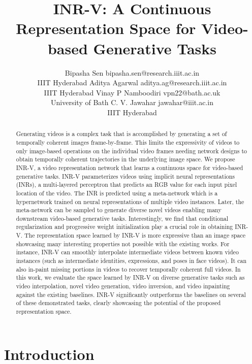 \documentclass[10pt]{article} \usepackage[accepted]{tmlr}
\title {INR-V: A Continuous Representation Space for Video-based Generative Tasks}
\author{\name Bipasha Sen \email bipasha.sen@research.iiit.ac.in \\
      \addr IIIT Hyderabad
      \AND
      \name Aditya Agarwal \email aditya.ag@research.iiit.ac.in \\
      \addr IIIT Hyderabad
      \AND
      \name Vinay P Namboodiri \email vpn22@bath.ac.uk \\
      \addr University of Bath
      \AND
      \name C. V. Jawahar \email
      jawahar@iiit.ac.in\\
      \addr IIIT Hyderabad}
\begin{document}
\maketitle

\def\thefootnote{*}

\begin{abstract}
Generating videos is a complex task that is accomplished by generating a set of temporally coherent images frame-by-frame. This limits the expressivity of videos to only image-based operations on the individual video frames needing network designs to obtain temporally coherent trajectories in the underlying image space. We propose INR-V, a video representation network that learns a continuous space for video-based generative tasks. INR-V parameterizes videos using implicit neural representations (INRs), a multi-layered perceptron that predicts an RGB value for each input pixel location of the video. The INR is predicted using a meta-network which is a hypernetwork trained on neural representations of multiple video instances. Later, the meta-network can be sampled to generate diverse novel videos enabling many downstream video-based generative tasks. Interestingly, we find that conditional regularization and progressive weight initialization play a crucial role in obtaining INR-V. The representation space learned by INR-V is more expressive than an image space showcasing many interesting properties not possible with the existing works. For instance, INR-V can smoothly interpolate intermediate videos between known video instances (such as intermediate identities, expressions, and poses in face videos). It can also in-paint missing portions in videos to recover temporally coherent full videos. In this work, we evaluate the space learned by INR-V on diverse generative tasks such as video interpolation, novel video generation, video inversion, and video inpainting against the existing baselines. INR-V significantly outperforms the baselines on several of these demonstrated tasks, clearly showcasing the potential of the proposed representation space.
\end{abstract}

\section{Introduction}
\label{sec:introduction}
\end{document}
